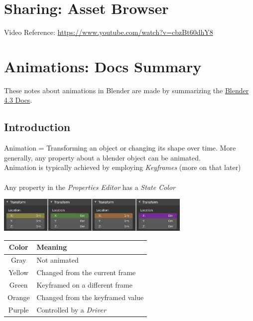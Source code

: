 \documentclass{article}
\begin{document}
\section{Sharing: Asset Browser}
Video Reference: \href{https://www.youtube.com/watch?v=cbzBt60dhY8}{https://www.youtube.com/watch?v=cbzBt60dhY8}\\

\section{Animations: Docs Summary}
These notes about animations in Blender are made by summarizing the \href{https://docs.blender.org/manual/en/4.3/animation/introduction.html}{Blender 4.3 Docs}.

\subsection{Introduction}

Animation = Transforming an object or changing its shape over time. More generally, any property about a blender object can be animated. \\
Animation is typically achieved by employing \textit{Keyframes} (more on that later) \\\\
Any property in the \textit{Properties Editor} has a \textit{State Color}

\begin{center}
    \includegraphics[width=0.7\textwidth]{blender_docs_images/animation_introduction_state-colors.png}
\end{center}

\begin{longtable}{cl}
    \toprule
    \textbf{Color} & \textbf{Meaning}                 \\
    \midrule
    \endhead
    \bottomrule
    \endfoot

    Gray           & Not animated                     \\
    Yellow         & Changed from the current frame   \\
    Green          & Keyframed on a different frame   \\
    Orange         & Changed from the keyframed value \\
    Purple         & Controlled by a \textit{Driver}  \\
\end{longtable}
\end{document}
